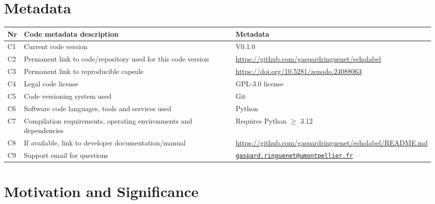 \documentclass[
  number,
  preprint,
  3p]{elsarticle}
\newcounter{none} %
\begin{document}
\section*{Metadata}\label{metadata}

{\def\LTcaptype{none} %
\begin{longtable}[]{@{}
  >{\raggedright\arraybackslash}p{}
  >{\raggedright\arraybackslash}p{}
  >{\raggedright\arraybackslash}p{}@{}}
\toprule\noalign{}
\begin{minipage}[b]{\linewidth}\raggedright
Nr
\end{minipage} & \begin{minipage}[b]{\linewidth}\raggedright
Code metadata description
\end{minipage} & \begin{minipage}[b]{\linewidth}\raggedright
Metadata
\end{minipage} \\
\midrule\noalign{}
\endhead
\bottomrule\noalign{}
\endlastfoot
C1 & Current code version & V0.1.0 \\
C2 & Permanent link to code/repository used for this code version &
\url{https://github.com/gaspardringuenet/echolabel} \\
C3 & Permanent link to reproducible capsule &
\url{https://doi.org/10.5281/zenodo.24088063} \\
C4 & Legal code license & GPL-3.0 license \\
C5 & Code versioning system used & Git \\
C6 & Software code languages, tools and services used & Python \\
C7 & Compilation requirements, operating environments and dependencies &
Requires Python \(\geq\) 3.12 \\
C8 & If available, link to developer documentation/manual &
\url{https://github.com/gaspardringuenet/echolabel/README.md} \\
C9 & Support email for questions &
\href{mailto:gaspard.ringuenet@umontpellier.fr}{\nolinkurl{gaspard.ringuenet@umontpellier.fr}} \\
\end{longtable}
}

\section{Motivation and Significance}\label{motivation-and-significance}
\end{document}
